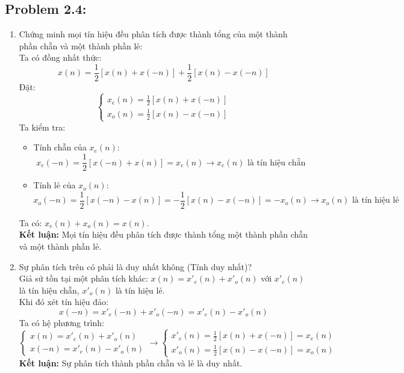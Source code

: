 \subsection{Problem 2.4:}
\begin{enumerate}
    \item Chứng minh mọi tín hiệu đều phân tích được thành tổng của một thành phần chẵn và một thành phần lẻ:\\
    Ta có đồng nhất thức:
    \[
    x(n) = \frac{1}{2}[x(n) + x(-n)] + \frac{1}{2}[x(n) - x(-n)]
    \]
    Đặt:
    \[
    \begin{cases}
        x_e(n) = \frac{1}{2}[x(n) + x(-n)] \\
        x_o(n) = \frac{1}{2}[x(n) - x(-n)]
    \end{cases}
    \]
    Ta kiểm tra:
    \begin{itemize}
        \item Tính chẵn của $x_e(n)$:
        $$
        x_e(-n) = \frac{1}{2}[x(-n) + x(n)] = x_e(n) \rightarrow x_e(n) \text{ là tín hiệu chẵn}
        $$
        \item Tính lẻ của $x_o(n)$:
        $$
        x_o(-n) = \frac{1}{2}[x(-n) - x(n)] = -\frac{1}{2}[x(n) - x(-n)] = -x_o(n) \rightarrow x_o(n) \text{ là tín hiệu lẻ}
        $$
    \end{itemize}
    Ta có: $x_e(n) + x_o(n) = x(n)$.\\
    \textbf{Kết luận:} Mọi tín hiệu đều phân tích được thành tổng một thành phần chẵn và một thành phần lẻ.

    \item Sự phân tích trên có phải là duy nhất không (Tính duy nhất)?\\
    Giả sử tồn tại một phân tích khác: $x(n) = x'_e(n) + x'_o(n)$ với $x'_e(n)$ là tín hiệu chẵn, $x'_o(n)$ là tín hiệu lẻ.\\
    Khi đó xét tín hiệu đảo:
    $$
    x(-n) = x'_e(-n) + x'_o(-n) = x'_e(n) - x'_o(n)
    $$
    Ta có hệ phương trình:
    \[
    \begin{cases}
        x(n) = x'_e(n) + x'_o(n) \\
        x(-n) = x'_e(n) - x'_o(n)
    \end{cases}
    \rightarrow
    \begin{cases}
        x'_e(n) = \frac{1}{2}[x(n) + x(-n)] = x_e(n) \\
        x'_o(n) = \frac{1}{2}[x(n) - x(-n)] = x_o(n)
    \end{cases}
    \]
    \textbf{Kết luận:} Sự phân tích thành phần chẵn và lẻ là duy nhất.


\end{enumerate}
